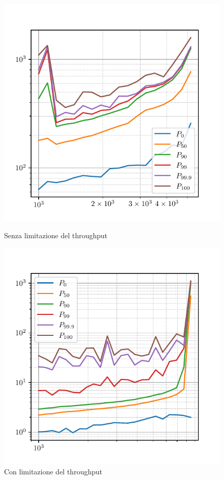 \begin{figure}[htbp]
    \centering
    \begin{minipage}[t]{0.48\textwidth}
        \centering
        \includegraphics[width=\textwidth]{03-risultati/bench-set-no-throttling}
        \caption*{Senza limitazione del throughput}
    \end{minipage}
    \hfill
    \begin{minipage}[t]{0.48\textwidth}
        \centering
        \includegraphics[width=\textwidth]{03-risultati/bench-set-throttling}
        \caption*{Con limitazione del throughput}
    \end{minipage}


\end{figure}
